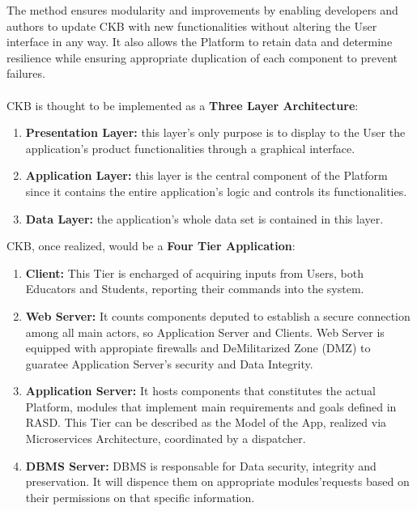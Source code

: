 The method ensures modularity and improvements by enabling developers and authors to update CKB with new functionalities without altering the User interface in any way. It also allows the Platform to retain data and determine 
resilience while ensuring appropriate duplication of each component to prevent failures.\\
\\
CKB is thought to be implemented as a \textbf{Three Layer Architecture}:
\begin{enumerate}[label=$\bullet$]
    \item \textbf{Presentation Layer:} this layer's only purpose is to display to the User the application's product functionalities through a graphical interface.
    \item \textbf{Application Layer:} this layer is the central component of the Platform since it contains the entire application's logic and controls its functionalities.
    \item \textbf{Data Layer:} the application's whole data set is contained in this layer.
\end{enumerate}
CKB, once realized, would be a \textbf{Four Tier Application}:
\begin{enumerate}
    \item \textbf{Client:} This Tier is encharged of acquiring inputs from Users, both Educators and Students, reporting their commands into the system.
    \item \textbf{Web Server:} It counts components deputed to establish a secure connection among all main actors, so Application Server and Clients. Web Server is equipped with appropiate firewalls and DeMilitarized Zone (DMZ) to guaratee Application Server's security and Data Integrity.
    \item \textbf{Application Server:} It hosts components that constitutes the actual Platform, modules that implement main requirements and goals defined in RASD. This Tier can be described as the Model of the App, realized via Microservices Architecture, coordinated by a dispatcher.
    \item \textbf{DBMS Server:} DBMS is responsable for Data security, integrity and preservation. It will dispence them on appropriate modules'requests based on their permissions on that specific information. 
\end{enumerate}
